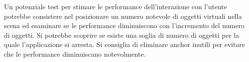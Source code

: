 \documentclass[crop=false, class=book]{standalone}
\begin{document}
	\noindent
	Un potenziale test per stimare le performance dell'interazione con l'utente potrebbe consistere nel posizionare un numero notevole di oggetti virtuali nella scena ed esaminare se le performance diminuiscono con l'incremento del numero di oggetti. Si potrebbe scoprire se esiste una soglia di numero di oggetti per la quale l'applicazione si arresta. Si consiglia di eliminare anchor inutili per evitare che le performance diminuiscano notevolmente.

			
	
\end{document}
